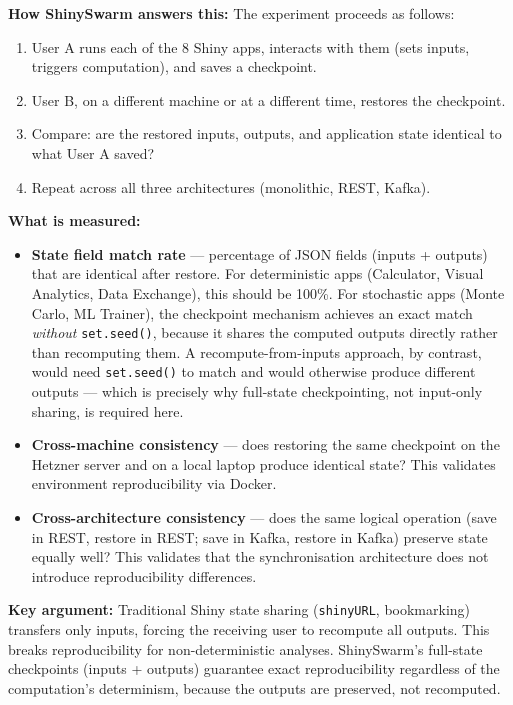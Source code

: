 \documentclass[12pt,a4paper]{article}
\begin{document}
\textbf{How ShinySwarm answers this:} The experiment proceeds as follows:

\begin{enumerate}[nosep]
  \item User A runs each of the 8 Shiny apps, interacts with them (sets inputs, triggers computation), and saves a checkpoint.
  \item User B, on a different machine or at a different time, restores the checkpoint.
  \item Compare: are the restored inputs, outputs, and application state identical to what User A saved?
  \item Repeat across all three architectures (monolithic, REST, Kafka).
\end{enumerate}

\textbf{What is measured:}
\begin{itemize}[nosep]
  \item \textbf{State field match rate} --- percentage of JSON fields (inputs + outputs) that are identical after restore. For deterministic apps (Calculator, Visual Analytics, Data Exchange), this should be 100\%. For stochastic apps (Monte Carlo, ML Trainer), the checkpoint mechanism achieves an exact match \emph{without} \texttt{set.seed()}, because it shares the computed outputs directly rather than recomputing them. A recompute-from-inputs approach, by contrast, would need \texttt{set.seed()} to match and would otherwise produce different outputs --- which is precisely why full-state checkpointing, not input-only sharing, is required here.
  \item \textbf{Cross-machine consistency} --- does restoring the same checkpoint on the Hetzner server and on a local laptop produce identical state? This validates environment reproducibility via Docker.
  \item \textbf{Cross-architecture consistency} --- does the same logical operation (save in REST, restore in REST; save in Kafka, restore in Kafka) preserve state equally well? This validates that the synchronisation architecture does not introduce reproducibility differences.
\end{itemize}

\textbf{Key argument:} Traditional Shiny state sharing (\texttt{shinyURL}, bookmarking) transfers only inputs, forcing the receiving user to recompute all outputs. This breaks reproducibility for non-deterministic analyses. ShinySwarm's full-state checkpoints (inputs + outputs) guarantee exact reproducibility regardless of the computation's determinism, because the outputs are preserved, not recomputed.
\end{document}
